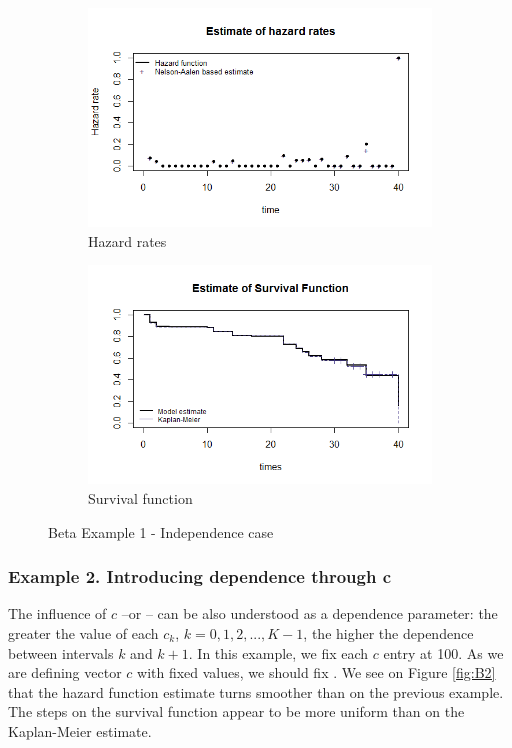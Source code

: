 \documentclass[letterpaper]{article}\usepackage[]{graphicx}\usepackage[]{xcolor}
\begin{document}
\begin{figure}
  \centering
  \begin{subfigure}[a]{\textwidth}\centering
    \includegraphics[width=\textwidth]{B11.png}
    \caption{Hazard rates}
  \end{subfigure}
  \begin{subfigure}[b]{\textwidth}\centering
    \includegraphics[width=\textwidth]{B12.png}
    \caption{Survival function}
  \end{subfigure}
  \caption{Beta Example 1 - Independence case}
  \label{fig:B1}
\end{figure}
 
\subsubsection{Example 2. Introducing dependence through c}

The influence of $c$ --or -- can be also understood as a dependence parameter: the greater the value of each $c_k$, $k=0,1,2,...,K-1$, the higher the dependence between intervals $k$ and $k+1$. In this example, we fix each $c$ entry at 100. As we are defining vector $c$ with fixed values, we should fix . We see on Figure \ref{fig:B2} that the hazard function estimate turns smoother than on the previous example. The steps on the survival function appear to be more uniform than on the Kaplan-Meier estimate. 
 
\end{document}
